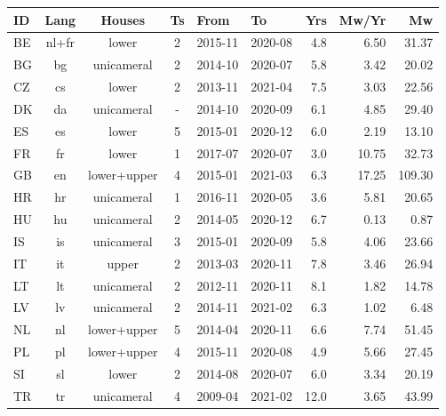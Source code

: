 \begin{tabular}{l|c|c|cllr|rr}
ID&Lang&Houses&Ts&From&To&Yrs&Mw/Yr&Mw\\
\hline
BE&nl+fr&lower&2&2015-11&2020-08&4.8&6.50&31.37\\
BG&bg&unicameral&2&2014-10&2020-07&5.8&3.42&20.02\\
CZ&cs&lower&2&2013-11&2021-04&7.5&3.03&22.56\\
DK&da&unicameral&-&2014-10&2020-09&6.1&4.85&29.40\\
ES&es&lower&5&2015-01&2020-12&6.0&2.19&13.10\\
FR&fr&lower&1&2017-07&2020-07&3.0&10.75&32.73\\
GB&en&lower+upper&4&2015-01&2021-03&6.3&17.25&109.30\\
HR&hr&unicameral&1&2016-11&2020-05&3.6&5.81&20.65\\
HU&hu&unicameral&2&2014-05&2020-12&6.7&0.13&0.87\\
IS&is&unicameral&3&2015-01&2020-09&5.8&4.06&23.66\\
IT&it&upper&2&2013-03&2020-11&7.8&3.46&26.94\\
LT&lt&unicameral&2&2012-11&2020-11&8.1&1.82&14.78\\
LV&lv&unicameral&2&2014-11&2021-02&6.3&1.02&6.48\\
NL&nl&lower+upper&5&2014-04&2020-11&6.6&7.74&51.45\\
PL&pl&lower+upper&4&2015-11&2020-08&4.9&5.66&27.45\\
SI&sl&lower&2&2014-08&2020-07&6.0&3.34&20.19\\
TR&tr&unicameral&4&2009-04&2021-02&12.0&3.65&43.99\\
\end{tabular}
